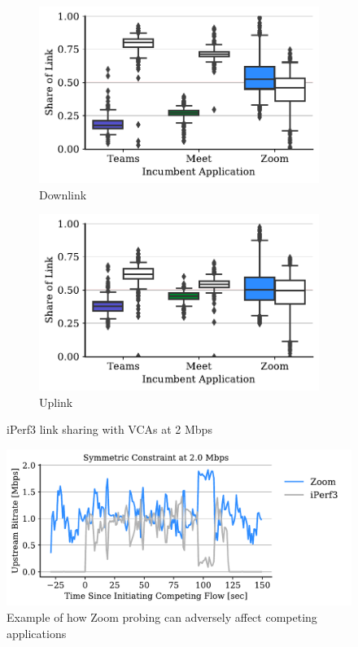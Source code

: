 \begin{figure}[t!]
\centering
\begin{subfigure}[t]{.4\textwidth}
    \centering
    \includegraphics[width=1\textwidth]{figures/comp/box_plot_iperf_dl_2.0_all.pdf}
    \caption{Downlink}
    \label{fig:boxplot-iperf-dl}
\end{subfigure}\hfill
\begin{subfigure}[t]{.4\textwidth}
    \centering
    \includegraphics[width=1\textwidth]{figures/comp/box_plot_iperfup_ul_2.0_all.pdf}
    \caption{Uplink}
    \label{subfig:boxplot-iperf-ul}
\end{subfigure}
\caption{iPerf3 link sharing with VCAs at 2 Mbps}
\label{fig:boxplot-iperf}
\end{figure}

\begin{figure}[th]
    \centering
    \includegraphics[width=\linewidth]{figures/comp/zoom_vs_iperf_2_down.pdf}
    \caption{Example of how Zoom probing can adversely affect competing applications}
	\label{fig:zoom-iperf-dl-2}
\end{figure}


